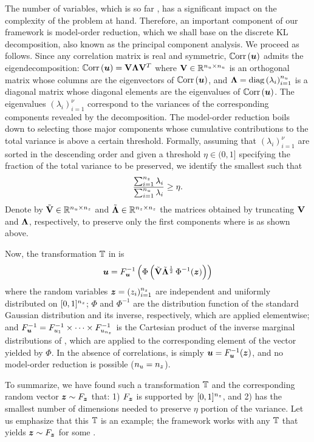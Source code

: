 The number of variables, which is so far \nu, has a significant impact on the
complexity of the problem at hand. Therefore, an important component of our
framework is model-order reduction, which we shall base on the discrete \acf{KL}
decomposition, also known as the principal component analysis. We proceed as
follows. Since any correlation matrix is real and symmetric, $\correlation{\vu}$
admits the eigendecomposition: $\correlation{\vu} = \m{V} \m{\Lambda} \m{V}^T$
where $\mathbf{V} \in \mathbb{R}^{{n_{u}} \times {n_{u}}}$ is an orthogonal matrix whose columns
are the eigenvectors of $\correlation{\vu}$, and $\m{\Lambda} =
\diagonal{\lambda_i}_{i = 1}^\nu$ is a diagonal matrix whose diagonal elements
are the eigenvalues of $\correlation{\vu}$. The eigenvalues $(\lambda_i)_{i =
1}^\nu$ correspond to the variances of the corresponding components revealed by
the decomposition. The model-order reduction boils down to selecting those major
components whose cumulative contributions to the total variance is above a
certain threshold. Formally, assuming that $(\lambda_i)_{i = 1}^\nu$ are sorted
in the descending order and given a threshold $\eta \in (0, 1]$ specifying the
fraction of the total variance to be preserved, we identify the smallest \nz
such that
\[
  \frac{\sum_{i = 1}^{n_{z}} \lambda_i}{\sum_{i = 1}^{n_{u}} \lambda_i} \geq \eta.
\]
Denote by $\tilde{\mathbf{V}} \in \mathbb{R}^{{n_{u}} \times {n_{z}}}$ and $\tilde{\mathbf{\Lambda}}
\in\mathbb{R}^{{n_{z}} \times {n_{z}}}$ the matrices obtained by truncating $\mathbf{V}$ and
$\mathbf{\Lambda}$, respectively, to preserve only the first \nz components where \nz
is as shown above.

Now, the transformation $\transform$ in  is
\[
  \boldsymbol{u} = F_{\boldsymbol{u}}^{-1} \left( \Phi\left( \tilde{\mathbf{V}} \tilde{\mathbf{\Lambda}}^\frac{1}{2} \, \Phi^{-1}(\boldsymbol{z}) \right) \right)
\]
where the random variables $\boldsymbol{z} = (z_i)_{i = 1}^{n_{z}}$ are independent and
uniformly distributed on $[0, 1]^{n_{z}}$; $\Phi$ and $\Phi^{-1}$ are the
distribution function of the standard Gaussian distribution and its inverse,
respectively, which are applied elementwise; and $F_{\boldsymbol{u}}^{-1} = F_{u_1}^{-1}
\times \cdots \times F_{u_{n_{z}}}^{-1}$ is the Cartesian product of the inverse
marginal distributions of \vu, which are applied to the corresponding element of
the vector yielded by $\Phi$. In the absence of correlations,
 is simply $\boldsymbol{u} = F_{\boldsymbol{u}}^{-1}(\boldsymbol{z})$, and no
model-order reduction is possible (${n_{u}} = {n_{z}}$).

To summarize, we have found such a transformation $\transform$ and the
corresponding random vector $\boldsymbol{z} \sim F_{\boldsymbol{z}}$ that: 1) $F_{\boldsymbol{z}}$ is supported
by $[0, 1]^{n_{z}}$, and 2) \vz has the smallest number of dimensions \nz needed to
preserve $\eta$ portion of the variance. Let us emphasize that this $\transform$
is an example; the framework works with any $\transform$ that yields $\boldsymbol{z} \sim
F_{\boldsymbol{z}}$ for some \nz.

